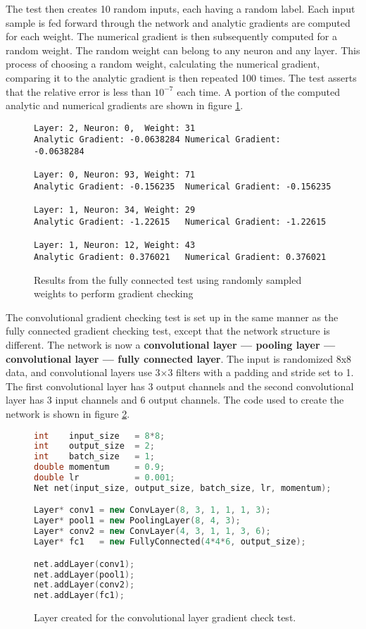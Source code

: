 \par
The test then creates 10 random inputs, each having a random label. Each input sample is fed forward through the network and analytic gradients are computed for each weight. The numerical gradient is then subsequently computed for a random weight. The random weight can belong to any neuron and any layer. This process of choosing a random weight, calculating the numerical gradient, comparing it to the analytic gradient is then repeated 100 times. The test asserts that the relative error is less than $10^{-7}$ each time. A portion of the computed analytic and numerical gradients are shown in figure \ref{num-grads}.
\begin{figure}
	\begin{lstlisting}
Layer: 2, Neuron: 0,  Weight: 31 
Analytic Gradient: -0.0638284 Numerical Gradient: -0.0638284

Layer: 0, Neuron: 93, Weight: 71 
Analytic Gradient: -0.156235  Numerical Gradient: -0.156235

Layer: 1, Neuron: 34, Weight: 29 
Analytic Gradient: -1.22615   Numerical Gradient: -1.22615

Layer: 1, Neuron: 12, Weight: 43 
Analytic Gradient: 0.376021   Numerical Gradient: 0.376021		
	\end{lstlisting}
	\caption{Results from the fully connected test using randomly sampled weights to perform gradient checking}
	\label{num-grads}
\end{figure}

The convolutional gradient checking test is set up in the same manner as the fully connected gradient checking test, except that the network structure is different. The network is now a \textbf{convolutional layer --- pooling layer --- convolutional layer --- fully connected layer}. The input is randomized 8x8 data, and convolutional layers use 3$\times$3 filters with a padding and stride set to 1. The first convolutional layer has 3 output channels and the second convolutional layer has 3 input channels and 6 output channels. The code used to create the network is shown in figure \ref{conv-net}.

\begin{figure}
	\begin{lstlisting}[language=C++]
int    input_size   = 8*8;
int    output_size  = 2;
int    batch_size   = 1;
double momentum     = 0.9;
double lr           = 0.001; 
Net net(input_size, output_size, batch_size, lr, momentum);

Layer* conv1 = new ConvLayer(8, 3, 1, 1, 1, 3);
Layer* pool1 = new PoolingLayer(8, 4, 3);
Layer* conv2 = new ConvLayer(4, 3, 1, 1, 3, 6);
Layer* fc1   = new FullyConnected(4*4*6, output_size);

net.addLayer(conv1);
net.addLayer(pool1);
net.addLayer(conv2);
net.addLayer(fc1);	
	\end{lstlisting}
	\caption{Layer created for the convolutional layer gradient check test.}
	\label{conv-net}
\end{figure}


